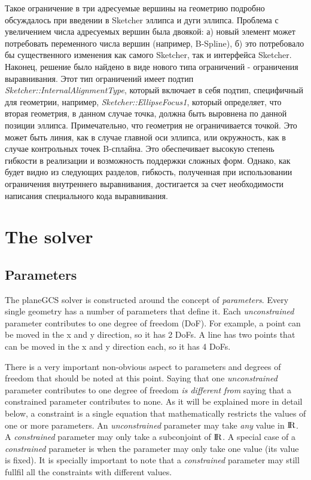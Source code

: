 \documentclass[12pt,twoside,a4paper]{book}
\newenvironment{tolerant}[1]{%
  \par\tolerance=#1\relax
}{%
  \par
}
\begin{document}
\begin{tolerant}{500}
    Такое ограничение в три адресуемые вершины на геометрию подробно обсуждалось при введении в Sketcher эллипса и дуги эллипса. Проблема с увеличением числа адресуемых вершин была двоякой: а) новый элемент может потребовать переменного числа вершин (например, B-Spline), б) это потребовало бы существенного изменения как самого Sketcher, так и интерфейса Sketcher. Наконец, решение было найдено в виде нового типа ограничений - ограничения выравнивания. Этот тип ограничений имеет подтип \emph{Sketcher::InternalAlignmentType}, который включает в себя подтип, специфичный для геометрии, например, \emph{Sketcher::EllipseFocus1}, который определяет, что вторая геометрия, в данном случае точка, должна быть выровнена по данной позиции эллипса. Примечательно, что геометрия не ограничивается точкой. Это может быть линия, как в случае главной оси эллипса, или окружность, как в случае контрольных точек B-сплайна. Это обеспечивает высокую степень гибкости в реализации и возможность поддержки сложных форм. Однако, как будет видно из следующих разделов, гибкость, полученная при использовании ограничения внутреннего выравнивания, достигается за счет необходимости написания специального кода выравнивания.
    \end{tolerant}

    \section{The solver}

    \subsection{Parameters}
    \label{sec:architecture:solver:parameters}

    The planeGCS solver is constructed around the concept of \emph{parameters}. Every single geometry has a number of parameters that define it. Each \emph{unconstrained} parameter contributes to one degree of freedom (DoF). For example, a point can be moved in the x and y direction, so it has 2 DoFs. A line has two points that can be moved in the x and y direction each, so it has 4 DoFs.

    There is a very important non-obvious aspect to parameters and degrees of freedom that should be noted at this point. Saying that one \emph{unconstrained} parameter contributes to one degree of freedom \emph{is different from} saying that a constrained parameter contributes to none. As it will be explained more in detail below, a constraint is a single equation that mathematically restricts the values of one or more parameters. An \emph{unconstrained} parameter may take \emph{any} value in ${\rm I\!R}$. A \emph{constrained} parameter may only take a subconjoint of ${\rm I\!R}$. A special case of a \emph{constrained} parameter is when the parameter may only take one value (its value is fixed). It is specially important to note that a \emph{constrained} parameter may still fullfil all the constraints with different values.
\end{document}
